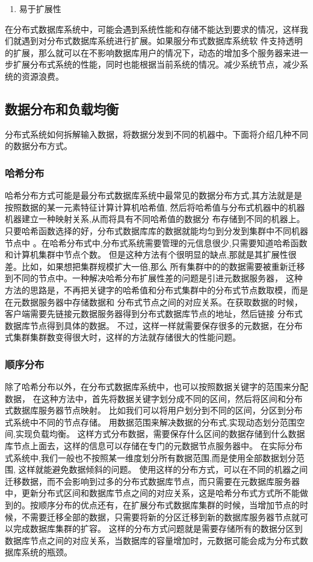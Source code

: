 	\begin{enumerate}[resume]
		\item 易于扩展性
	\end{enumerate}

	在分布式数据库系统中，可能会遇到系统性能和存储不能达到要求的情况，这样我们就遇到对分布式数据库系统进行扩展。如果服分布式数据库系统软
	件支持透明的扩展，那么就可以在不影响数据库用户的情况下，动态的增加多个服务器来进一步扩展分布式系统的性能，同时也能根据当前系统的情况。减少系统节点，减少系统的资源浪费。
\subsection{数据分布和负载均衡}
分布式系统如何拆解输入数据，将数据分发到不同的机器中。下面将介绍几种不同的数据分布方式。 
\subsubsection{哈希分布}
哈希分布方式可能是最分布式数据库系统中最常见的数据分布方式,其方法就是是按照数据的某一元素特征计算计算机哈希值,
然后将哈希值与分布式机器中的机器机器建立一种映射关系,从而将具有不同哈希值的数据分
布存储到不同的机器上。
只要哈希函数选择的好，分布式数据库库的数据就能均匀到分发到集群中不同机器节点中
。在哈希分布式中,分布式系统需要管理的元信息很少,只需要知道哈希函数和计算机集群中节点个数。 
但是这种方法有个很明显的缺点,那就是其扩展性很差。比如，如果想把集群规模扩大一倍,那么
所有集群中的的数据需要被重新迁移到不同的节点中。一种解决哈希分布扩展性差的问题是引进元数据服务器， 
这种方法的思路是，不再把关键字的哈希值和分布式集群中的分布式节点数取模，而是在元数据服务器中存储数据和
分布式节点之间的对应关系。在获取数据的时候，客户端需要先链接元数据服务器得到分布式数据库节点的地址，然后链接
分布式数据库节点得到具体的数据。
不过，这样一样就需要保存很多的元数据，在分布式集群集群数变得很大时，这样的方法就存储很大的性能问题。
\subsubsection{顺序分布}
除了哈希分布以外，在分布式数据库系统中，也可以按照数据关键字的范围来分配数据，
在这种方法中，首先将数据关键字划分成不同的区间，然后将区间和分布式数据库服务器节点映射。
比如我们可以将用户划分到不同的区间，分区到分布式系统中不同的节点存储。
用数据范围来解决数据的分布式,实现动态划分范围空间,实现负载均衡。 
这样方式分布数据，需要保存什么区间的数据存储到什么数据库节点上面去，这样的信息可以存储在专门的元数据节点服务器中。 
在实际分布式系统中,我们一般也不按照某一维度划分所有数据范围,而是使用全部数据划分范围,
这样就能避免数据倾斜的问题。 
使用这样的分布方式，可以在不同的机器之间迁移数据，而不会影响到过多的分布式数据库节点，而只需要在元数据库服务器中，更新分布式区间和数据库节点之间的对应关系，这是哈希分布式方式所不能做到的。按顺序分布的优点还有，在扩展分布式数据库集群的时候，当增加节点的时候，不需要迁移全部的数据，只需要将新的分区迁移到新的数据库服务器节点就可以完成数据库集群的扩容。
这样的分布方式问题就是需要存储所有的数据分区到数据库节点之间的对应关系，当数据库的容量增加时，元数据可能会成为分布式数据库系统的瓶颈。
